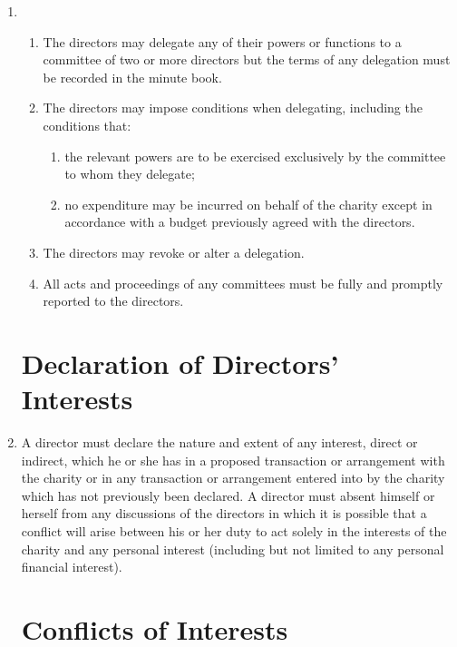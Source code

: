 \begin{enumerate}
\item
  \begin{enumerate}
  \item
    The directors may delegate any of their powers or functions to a
    committee of two or more directors but the terms of any delegation
    must be recorded in the minute book.
  \item
    The directors may impose conditions when delegating, including the
    conditions that:
    \begin{enumerate}
    \item
      the relevant powers are to be exercised exclusively by the
      committee to whom they delegate;
    \item
      no expenditure may be incurred on behalf of the charity except in
      accordance with a budget previously agreed with the directors.
    \end{enumerate}
  \item
    The directors may revoke or alter a delegation.
  \item
    All acts and proceedings of any committees must be fully and
    promptly reported to the directors.
  \end{enumerate}

\section{Declaration of Directors' Interests}

\item \label{directors-interests}
  A director must declare the nature and extent of any interest,
  direct or indirect, which he or she has in a proposed transaction
  or arrangement with the charity or in any transaction or
  arrangement entered into by the charity which has not previously
  been declared. A director must absent himself or herself from any
  discussions of the directors in which it is possible that a
  conflict will arise between his or her duty to act solely in the
      interests of the charity and any personal interest (including but
  not limited to any personal financial interest).

\section{Conflicts of Interests}


\end{enumerate}
